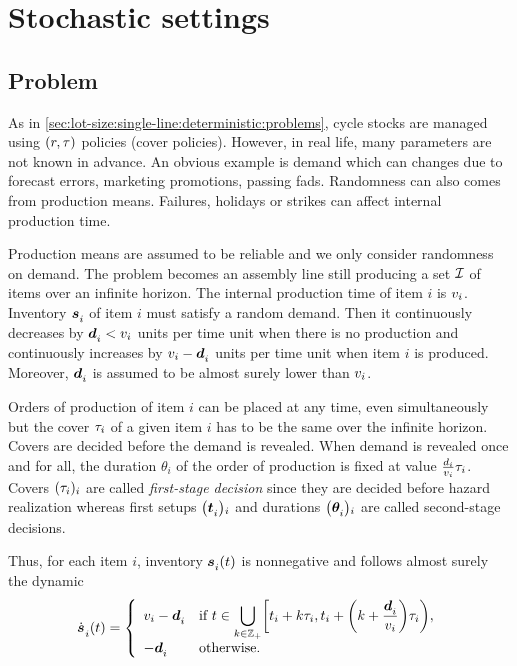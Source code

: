 \section{Stochastic settings}


\subsection{Problem}
\label{sec:lot-size:single-line:stochastic:problem}


As in \cref{sec:lot-size:single-line:deterministic:problems}, cycle stocks are managed using $(r,\tau)$ policies (\ie cover policies).
However, in real life, many parameters are not known in advance.
An obvious example is demand which can changes due to forecast errors, marketing promotions, passing fads.
Randomness can also comes from production means.
Failures, holidays or strikes can affect internal production time.


Production means are assumed to be reliable and we only consider randomness on demand.
The problem becomes an assembly line still producing a set $\mathcal{I}$ of items over an infinite horizon.
The internal production time of item $i$ is $v_i$.
Inventory $\va\inventory_i$ of item $i$ must satisfy a random demand.
Then it continuously decreases by $\va\demand_i<\rate_i$ units per time unit when there is no production and continuously increases by $\rate_i-\va\demand_i$ units per time unit when item $i$ is produced.
Moreover, $\va\demand_i$ is assumed to be almost surely lower than $v_i$.


Orders of production of item $i$ can be placed at any time, even simultaneously but the cover $\tau_i$ of a given item $i$ has to be the same over the infinite horizon.
Covers are decided before the demand is revealed.
When demand is revealed once and for all, the duration $\theta_i$ of the order of production is fixed at value $\frac{d_i}{v_i}\tau_i$.
Covers $\bracket{\cover_i}_i$ are called \emph{first-stage decision} since they are decided before hazard realization whereas first setups $\bracket{\va t_i}_i$ and durations $\bracket{\va\theta_i}_i$ are called second-stage decisions.

Thus, for each item $i$, inventory $\va\inventory_i\bracket{t}$ is nonnegative and follows almost surely the dynamic
\begin{equation}\label{eq:lot-size:single-line:deterministic:motivations:dynamic}
  \dot{\va\inventory}_i\bracket{t} =
  \left\{
  \begin{array}{ll}
  \rate_i-\va\demand_i
  & \ds\mbox{if}\ t\in\bigcup_{k\in\ZZ_+} \left[t_i+k\cover_i,t_i+\bracket{k+\frac{\va\demand_i}{\rate_i}}\cover_i\right),
  \\
  -\va\demand_i
  & \mbox{otherwise}.
  \end{array}
  \right.
\end{equation}

